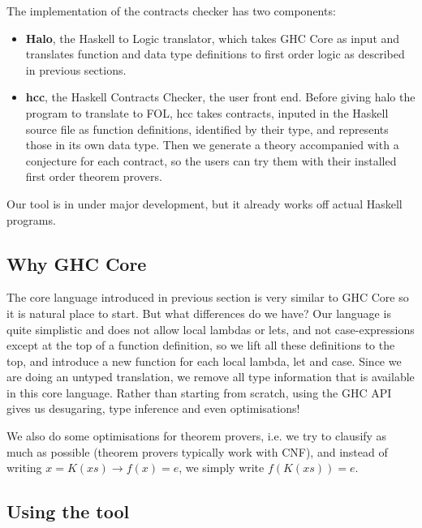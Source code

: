 The implementation of the contracts checker has two components:


\begin{itemize}
    \item \textbf{Halo}, the Haskell to Logic translator, which takes
       GHC Core as input and translates function and data type
       definitions to first order logic as described in previous sections.

     \item \textbf{hcc}, the Haskell Contracts Checker, the user front
        end. Before giving halo the program to translate to FOL, hcc
        takes contracts, inputed in the Haskell source file as function
        definitions, identified by their type, and represents those in
        its own data type. Then we generate a theory accompanied with a
        conjecture for each contract, so the users can try them with
        their installed first order theorem provers.
\end{itemize}

Our tool is in under major development, but it already works off
actual Haskell programs.

\subsection{Why GHC Core}

The core language introduced in previous section  is very
similar to GHC Core so it is natural place to start. But what
differences do we have? Our language
 is quite simplistic and does not allow local lambdas
or lets, and not case-expressions except at the top of a function
definition, so we lift all these definitions to the top, and introduce
a new function for each local lambda, let and case.  Since we are
doing an untyped translation, we remove all type information that is
available in this core language.
Rather than starting from scratch, using the GHC API gives us
desugaring, type inference and even optimisations!

We also do some optimisations for theorem provers, i.e. we try to
clausify as much as possible (theorem provers typically work with
CNF), and instead of writing $x = K(xs) \rightarrow f(x) = e$, we
simply write $f(K(xs)) = e$.

\subsection{Using the tool}

